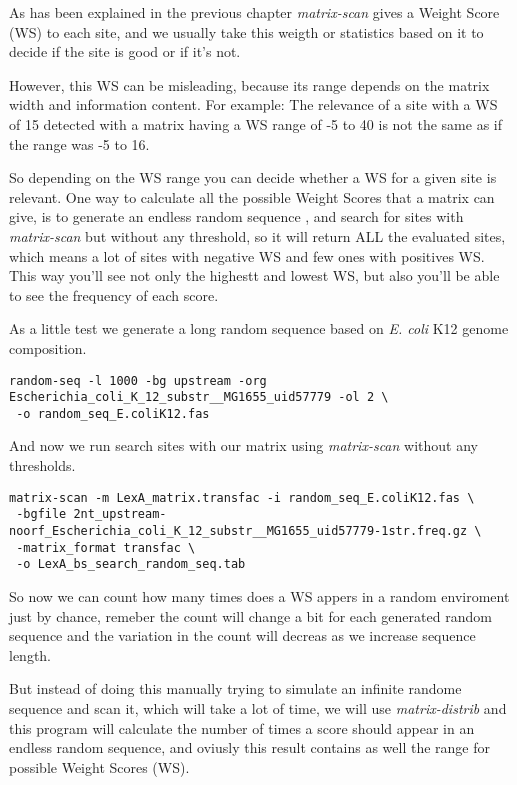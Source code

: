As has been explained in the previous chapter \textit{matrix-scan}
gives a Weight Score (WS) to each site, and we usually take this
weigth or statistics based on it to decide if the site is good or if
it's not.

However, this WS can be misleading, because its range depends on the
matrix width and information content. For example: The relevance of a
site with a WS of 15 detected with a matrix having a WS range of -5 to
40 is not the same as if the range was -5 to 16.

So depending on the WS range you can decide whether a WS for a given
site is relevant. One way to calculate all the possible Weight Scores
that a matrix can give, is to generate an endless random sequence ,
and search for sites with \textit{matrix-scan} but without any
threshold, so it will return ALL the evaluated sites, which means a
lot of sites with negative WS and few ones with positives
WS. This way you'll see not only the highestt and lowest WS, but also
you'll be able to see the frequency of each score.

As a little test we generate a long random sequence based on
\textit{E. coli} K12 genome composition.

{\color{Blue} \begin{footnotesize} 
\begin{verbatim}
random-seq -l 1000 -bg upstream -org Escherichia_coli_K_12_substr__MG1655_uid57779 -ol 2 \
 -o random_seq_E.coliK12.fas
\end{verbatim} \end{footnotesize}
}

And now we run search sites with our matrix using \textit{matrix-scan}
without any thresholds.

{\color{Blue} 
\begin{footnotesize}
\begin{verbatim}
matrix-scan -m LexA_matrix.transfac -i random_seq_E.coliK12.fas \
 -bgfile 2nt_upstream-noorf_Escherichia_coli_K_12_substr__MG1655_uid57779-1str.freq.gz \
 -matrix_format transfac \
 -o LexA_bs_search_random_seq.tab
\end{verbatim} 
\end{footnotesize} 
}
    
So now we can count how many times does a WS appers in a random
enviroment just by chance, remeber the count will change a bit for
each generated random sequence and the variation in the count will
decreas as we increase sequence length.

But instead of doing this manually trying to simulate an infinite
randome sequence and scan it, which will take a lot of time, we will
use \textit{matrix-distrib} and this program will calculate the number
of times a score should appear in an endless random sequence, and
oviusly this result contains as well the range for possible Weight
Scores (WS).

